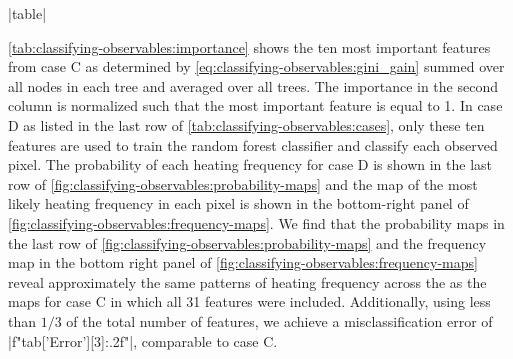 |table|

\autoref{tab:classifying-observables:importance} shows the ten most important features from case C as determined by \autoref{eq:classifying-observables:gini_gain} summed over all nodes in each tree and averaged over all trees. The importance in the second column is normalized such that the most important feature is equal to 1. In case D as listed in the last row of \autoref{tab:classifying-observables:cases}, only these ten features are used to train the random forest classifier and classify each observed pixel. The probability of each heating frequency for case D is shown in the last row of \autoref{fig:classifying-observables:probability-maps} and the map of the most likely heating frequency in each pixel is shown in the bottom-right panel of \autoref{fig:classifying-observables:frequency-maps}. We find that the probability maps in the last row of \autoref{fig:classifying-observables:probability-maps} and the frequency map in the bottom right panel of \autoref{fig:classifying-observables:frequency-maps} reveal approximately the same patterns of heating frequency across the \AR{} as the maps for case C in which all 31 features were included. Additionally, using less than $1/3$ of the total number of features, we achieve a misclassification error of |f"{tab['Error'][3]:.2f}"|, comparable to case C.

